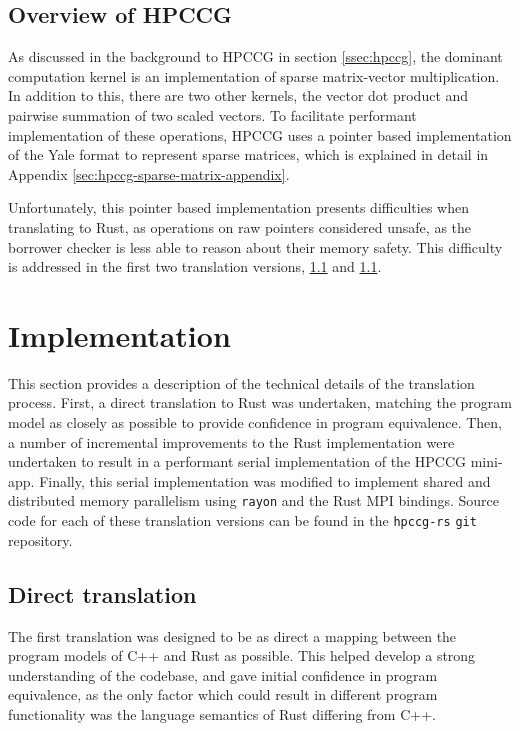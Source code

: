 \subsection{Overview of HPCCG}
\label{sec:overview-hpccg}

As discussed in the background to HPCCG in section \ref{ssec:hpccg}, the dominant computation kernel is an implementation of sparse matrix-vector multiplication. In addition to this, there are two other kernels, the vector dot product and pairwise summation of two scaled vectors. To facilitate performant implementation of these operations, HPCCG uses a pointer based implementation of the Yale format to represent sparse matrices, which is explained in detail in Appendix \ref{sec:hpccg-sparse-matrix-appendix}.

Unfortunately, this pointer based implementation presents difficulties when translating to Rust, as operations on raw pointers considered unsafe, as the borrower checker is less able to reason about their memory safety. This difficulty is addressed in the first two translation versions, \ref{sec:translation-direct} and \ref{sec:translation-direct}.

\section{Implementation}
\label{sec:translation-implementation}

This section provides a description of the technical details of the translation process.
First, a direct translation to Rust was undertaken, matching the program model as closely as possible to provide confidence in program equivalence. Then, a number of incremental improvements to the Rust implementation were undertaken to result in a performant serial implementation of the HPCCG \acrshort{mini-app}. Finally, this serial implementation was modified to implement shared and distributed memory parallelism using \texttt{rayon} and the Rust MPI bindings. Source code for each of these translation versions can be found in the \texttt{hpccg-rs} \texttt{git} repository.


\subsection{Direct translation}
\label{sec:translation-direct}
The first translation was designed to be as direct a mapping between the program models of C++ and Rust as possible. This helped develop a strong understanding of the codebase, and gave initial confidence in program equivalence, as the only factor which could result in different program functionality was the language semantics of Rust differing from C++.

